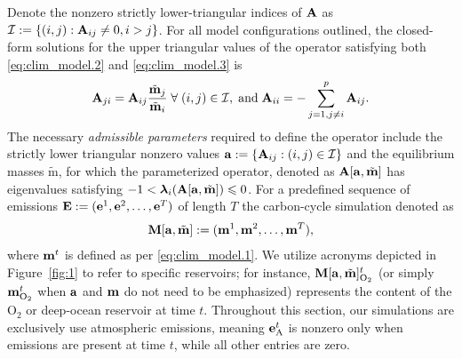 \documentclass[11pt, a4paper, pdftex, twoside, dvipsnames]{article}
\renewcommand{\ref}{\cref}
\newcommand{\bb}[1]{\boldsymbol{\bold{#1}}}
\newcommand{\bbt}[1]{\tilde{\boldsymbol{\mathrm{#1}}}}
\newcommand{\ameq}[0]{\bb{a},\bbt{m}}
\begin{document}
Denote the nonzero strictly lower-triangular indices of $\bb{A}$ as $\mathcal{I}:=\{(i,j):\bb{A}_{ij}\neq 0,i>j\}$.
%
For all model configurations outlined, the closed-form solutions for the upper triangular values of the operator satisfying both \eqref{eq:clim_model.2} and \eqref{eq:clim_model.3} is
%
\begin{align} \label{eq:clim_model.4}
	\bb{A}_{ji} = \bb{A}_{ij}  \frac{\bbt{m}_j}{\bbt{m}_i} \; \forall \; (i,j) \in \mathcal{I}, \; \text{and} \;  \bb{A}_{ii}= -\sum_{j=1,j\neq i}^p \bb{A}_{ij}.
\end{align}
%
The necessary \emph{admissible parameters} required to define the operator include the strictly lower triangular nonzero values $\bb{a}:=\{ \bb{A}_{ij}: (i,j) \in \mathcal{I} \}$ and the equilibrium masses $\bbt{m}$, for which the parameterized operator, denoted as $\bb{A}[\ameq]$ has eigenvalues satisfying $-1 < \bb{\lambda}_i(\bb{A}[\ameq]) \leqslant 0$.
%
For a predefined sequence of emissions $\bb{E}:=(\bb{e}^{1},\bb{e}^{2},\ldots,\bb{e}^T)$ of length $T$ the carbon-cycle simulation denoted as    
%
\begin{align} \label{eq:clim_model.5}
	\bb{M}[\ameq] := (\bb{m}^{1},\bb{m}^{2},\ldots,\bb{m}^{T} ), 
\end{align}
%
where $\bb{m}^{t}$ is defined as per \eqref{eq:clim_model.1}. 
%
We utilize acronyms depicted in Figure~\ref{fig:1} to refer to specific reservoirs; for instance, $\bb{M}[\ameq]^{t}_{\text{O}_2}$ (or simply $\bb{m}^t_{\text{O}_2}$ when $\bb{a}$ and $\bb{m}$ do not need to be emphasized) represents the content of the $\text{O}_2$ or deep-ocean reservoir at time $t$.
%
Throughout this section, our simulations are exclusively use atmospheric emissions, meaning $\bb{e}_{\text{A}}^t$ is nonzero only when emissions are present at time $t$, while all other entries are zero.
%
%
%
\end{document}
